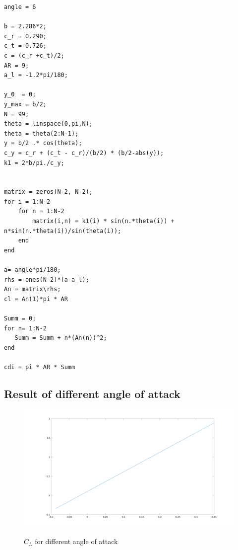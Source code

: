 \documentclass[12pt]{article}
\begin{document}
\begin{lstlisting}[caption={A function for SD},label={lst:script1}]
angle = 6

b = 2.286*2;
c_r = 0.290;
c_t = 0.726;
c = (c_r +c_t)/2;
AR = 9;
a_l = -1.2*pi/180;

y_0  = 0;
y_max = b/2;
N = 99;
theta = linspace(0,pi,N);
theta = theta(2:N-1);
y = b/2 .* cos(theta);
c_y = c_r + (c_t - c_r)/(b/2) * (b/2-abs(y));
k1 = 2*b/pi./c_y;


matrix = zeros(N-2, N-2);
for i = 1:N-2
    for n = 1:N-2
        matrix(i,n) = k1(i) * sin(n.*theta(i)) + n*sin(n.*theta(i))/sin(theta(i));
    end
end

a= angle*pi/180;
rhs = ones(N-2)*(a-a_l);
An = matrix\rhs;
cl = An(1)*pi * AR

Summ = 0;
for n= 1:N-2
   Summ = Summ + n*(An(n))^2;
end

cdi = pi * AR * Summ
\end{lstlisting}









\subsection{Result of different angle of attack}


\begin{figure}[H]
    \centering
    \includegraphics[width=1\textwidth]{Latex/figure/Cl.png}
    \label{IGs.jpg}
    \caption{$C_L$ for different angle of attack}
\end{figure}
\end{document}
